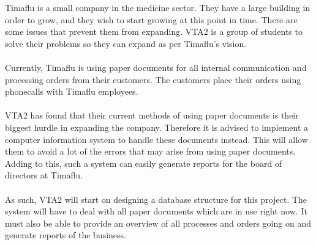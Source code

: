 \documentclass[11pt,english]{article}
\begin{document}
Timaflu is a small company in the medicine sector. They have a large building in
order to grow, and they wish to start growing at this point in time. There are
some issues that prevent them from expanding. VTA2 is a group of students to
solve their problems so they can expand as per Timaflu's vision.
\\ \\
Currently, Timaflu is using paper documents for all internal communication and
processing orders from their customers. The customers place their orders using
phonecalls with Timaflu employees.
\\ \\
VTA2 has found that their current methods of using paper documents is their
biggest hurdle in expanding the company. Therefore it is advised to implement a
computer information system to handle these documents instead. This will allow
them to avoid a lot of the errors that may arise from using paper documents.
Adding to this, such a system can easily generate reports for the board of
directors at Timaflu.
\\ \\
As such, VTA2 will start on designing a database structure for this project. The
system will have to deal with all paper documents which are in use right now. It
must also be able to provide an overview of all processes and orders going on
and generate reports of the business.
\end{document}
